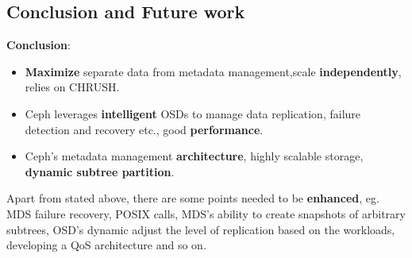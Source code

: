 \documentclass[cjk,slidestop,mathserif]{beamer}
\begin{document}
\begin{CJK}{UTF8}{gkai}
\section{Conclusion and Future work}
\begin{frame}
 \vspace{6pt}
 \textbf{Conclusion}:\\
 \begin{itemize}
  \item \textbf{Maximize} separate data from metadata management,scale \textbf{independently}, relies on CHRUSH.
  \item Ceph leverages \textbf{intelligent} OSDs to manage data replication, failure detection and recovery etc., good \textbf{performance}.
  \item Ceph's metadata management \textbf{architecture}, highly scalable storage, \textbf{dynamic subtree partition}.
 \end{itemize}
  \vspace{6pt}
  Apart from stated above, there are some points needed to be \textbf{enhanced}, eg. MDS failure recovery, 
  POSIX calls, MDS's ability to create snapshots of arbitrary subtrees, OSD's dynamic adjust the level of replication 
  based on the workloads, developing a QoS architecture and so on.
\end{frame}




\end{CJK}
\end{document}
